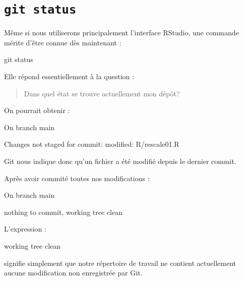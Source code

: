 \documentclass[
  letterpaper,
  DIV=11,
  numbers=noendperiod]{scrreprt}
\newenvironment{Shaded}{\begin{snugshade}}{\end{snugshade}}
\newcommand{\FunctionTok}[1]{\textcolor[rgb]{0.28,0.35,0.67}{#1}}
\newcommand{\NormalTok}[1]{\textcolor[rgb]{0.00,0.23,0.31}{#1}}
\begin{document}
\section*{\texorpdfstring{\texttt{git\ status}}{git status}}\label{git-status}


Même si nous utiliserons principalement l'interface RStudio, une
commande mérite d'être connue dès maintenant :

\begin{Shaded}
\begin{Highlighting}[]
\FunctionTok{git}\NormalTok{ status}
\end{Highlighting}
\end{Shaded}

Elle répond essentiellement à la question :

\begin{quote}
Dans quel état se trouve actuellement mon dépôt?
\end{quote}

On pourrait obtenir :

\begin{Shaded}
\begin{Highlighting}[]
\NormalTok{On branch main}

\NormalTok{Changes not staged for commit:}
\NormalTok{    modified: R/rescale01.R}
\end{Highlighting}
\end{Shaded}

Git nous indique donc qu'un fichier a été modifié depuis le dernier
commit.

Après avoir commité toutes nos modifications :

\begin{Shaded}
\begin{Highlighting}[]
\NormalTok{On branch main}

\NormalTok{nothing to commit, working tree clean}
\end{Highlighting}
\end{Shaded}

L'expression :

\begin{Shaded}
\begin{Highlighting}[]
\NormalTok{working tree clean}
\end{Highlighting}
\end{Shaded}

signifie simplement que notre répertoire de travail ne contient
actuellement aucune modification non enregistrée par Git.
\end{document}
